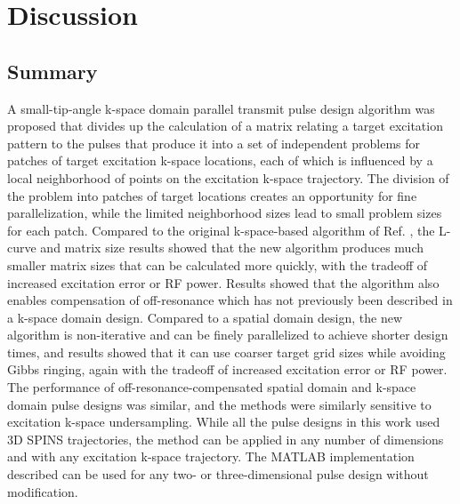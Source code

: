 \section*{Discussion}
\subsection*{Summary}
A small-tip-angle k-space domain parallel transmit pulse design algorithm was proposed
that divides up the calculation of a matrix relating a target excitation pattern to the pulses that produce it 
into a set of independent problems for patches of target excitation k-space locations,
each of which is influenced by a local neighborhood of points on the excitation k-space trajectory.
The division of the problem into patches of target locations creates an opportunity for fine parallelization,
while the limited neighborhood sizes lead to small problem sizes for each patch. 
Compared to the original k-space-based algorithm of Ref. \cite{Katscher:2003:Magn-Reson-Med:12509830},
the L-curve and matrix size results showed that 
the new algorithm produces much smaller matrix sizes that can be calculated more quickly,
with the tradeoff of increased excitation error or RF power. 
Results showed that the algorithm also enables compensation of off-resonance 
which has not previously been described in a k-space domain design. 
Compared to a spatial domain design,
the new algorithm is non-iterative and can be finely parallelized to achieve shorter design times, 
and results showed that it can use coarser target grid sizes while avoiding Gibbs ringing, 
again with the tradeoff of increased excitation error or RF power.
The performance of off-resonance-compensated spatial domain and k-space domain pulse designs was similar,
and the methods were similarly sensitive to excitation k-space undersampling. 
While all the pulse designs in this work used 3D SPINS trajectories,
the method can be applied in any number of dimensions and with any excitation k-space trajectory.
The MATLAB implementation described can be used for any two- or three-dimensional pulse design without modification.

